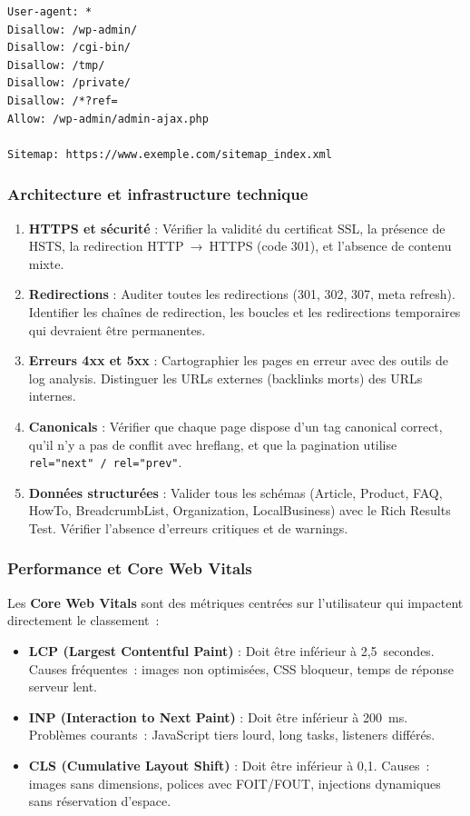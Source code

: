 \documentclass[12pt,a4paper,twoside]{report}
\newcommand{\keyword}[1]{\textbf{\textcolor{googleblue}{#1}}}
\begin{document}
\begin{lstlisting}[style=htmlcode,caption={Exemple de fichier robots.txt optimisé}]
User-agent: *
Disallow: /wp-admin/
Disallow: /cgi-bin/
Disallow: /tmp/
Disallow: /private/
Disallow: /*?ref=
Allow: /wp-admin/admin-ajax.php

Sitemap: https://www.exemple.com/sitemap_index.xml
\end{lstlisting}

\subsubsection{Architecture et infrastructure technique}

\begin{enumerate}
    \item \textbf{HTTPS et sécurité} : Vérifier la validité du certificat SSL, la présence de HSTS, la redirection HTTP~→~HTTPS (code 301), et l'absence de contenu mixte.
    \item \textbf{Redirections} : Auditer toutes les redirections (301, 302, 307, meta refresh). Identifier les chaînes de redirection, les boucles et les redirections temporaires qui devraient être permanentes.
    \item \textbf{Erreurs 4xx et 5xx} : Cartographier les pages en erreur avec des outils de log analysis. Distinguer les URLs externes (backlinks morts) des URLs internes.
    \item \textbf{Canonicals} : Vérifier que chaque page dispose d'un tag canonical correct, qu'il n'y a pas de conflit avec hreflang, et que la pagination utilise \texttt{rel="next" / rel="prev"}.
    \item \textbf{Données structurées} : Valider tous les schémas (Article, Product, FAQ, HowTo, BreadcrumbList, Organization, LocalBusiness) avec le Rich Results Test. Vérifier l'absence d'erreurs critiques et de warnings.
\end{enumerate}

\subsubsection{Performance et Core Web Vitals}

Les \keyword{Core Web Vitals} sont des métriques centrées sur l'utilisateur qui impactent directement le classement~:
\begin{itemize}
    \item \textbf{LCP (Largest Contentful Paint)} : Doit être inférieur à 2,5~secondes. Causes fréquentes~: images non optimisées, CSS bloqueur, temps de réponse serveur lent.
    \item \textbf{INP (Interaction to Next Paint)} : Doit être inférieur à 200~ms. Problèmes courants~: JavaScript tiers lourd, long tasks, listeners différés.
    \item \textbf{CLS (Cumulative Layout Shift)} : Doit être inférieur à 0,1. Causes~: images sans dimensions, polices avec FOIT/FOUT, injections dynamiques sans réservation d'espace.
\end{itemize}
\end{document}
